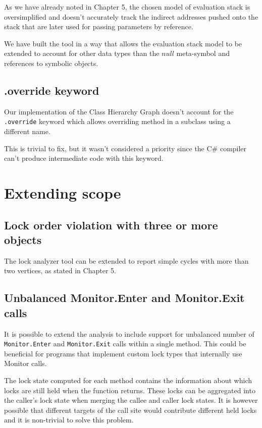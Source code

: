 As we have already noted in Chapter 5, the chosen model of evaluation stack is oversimplified and doesn't accurately track the indirect addresses pushed onto the stack that are later used for passing parameters by reference.

We have built the tool in a way that allows the evaluation stack model to be extended to account for other data types than the $null$ meta-symbol and references to symbolic objects.

\subsection{.override keyword}

Our implementation of the Class Hierarchy Graph doesn't account for the \texttt{.override} keyword which allows overriding method in a subclass using a different name.

This is trivial to fix, but it wasn't considered a priority since the C\# compiler can't produce intermediate code with this keyword.

\section{Extending scope}

\subsection{Lock order violation with three or more objects}

The lock analyzer tool can be extended to report simple cycles with more than two vertices, as stated in Chapter 5.

\subsection{Unbalanced Monitor.Enter and Monitor.Exit calls}

It is possible to extend the analysis to include support for unbalanced number of \texttt{Monitor.Enter} and \texttt{Monitor.Exit} calls within a single method. This could be beneficial for programs that implement custom lock types that internally use Monitor calls. %

The lock state computed for each method contains the information about which locks are still held when the function returns. These locks can be aggregated into the caller's lock state when merging the callee and caller lock states. It is however possible that different targets of the call site would contribute different held locks and it is non-trivial to solve this problem.

